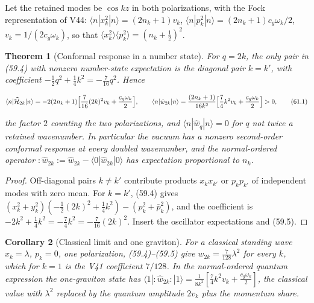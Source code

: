 \documentclass[11pt]{article}
\newtheorem{theorem}{Theorem}[section]
\newtheorem{corollary}[theorem]{Corollary}
\theoremstyle{remark}
\begin{document}
Let the retained modes be \(\cos kz\) in both polarizations, with the
Fock representation of V44: \(\langle n|x_k^2|n\rangle=(2n_k+1)v_k\),
\(\langle n|p_k^2|n\rangle=(2n_k+1)c_g\omega_k/2\), \(v_k=1/(2c_g\omega_k)\),
so that \(\langle x_k^2\rangle\langle p_k^2\rangle=(n_k+\tfrac12)^2\).

\begin{theorem}[Conformal response in a number state]
\label{thm:v19v58-conformal}
For \(q=2k\), the only pair in (59.4) with nonzero number-state
expectation is the diagonal pair \(k=k'\), with coefficient
\(-\tfrac12q^2+\tfrac14k^2=-\tfrac7{16}q^2\).  Hence

\[
 \langle n|\widehat{\cal H}_{2k}|n\rangle
 =-2(2n_k+1)\Bigl[\frac{7}{16}(2k)^2v_k+\frac{c_g\omega_k}2\Bigr],
 \qquad
 \langle n|\hat w_{2k}|n\rangle
 =\frac{(2n_k+1)}{16k^2}\Bigl[\frac74k^2v_k+\frac{c_g\omega_k}2\Bigr]>0,
                                                                    \tag{61.1}
\]

the factor \(2\) counting the two polarizations, and
\(\langle n|\hat w_q|n\rangle=0\) for \(q\) not twice a retained
wavenumber.  In particular the vacuum has a nonzero second-order
conformal response at every doubled wavenumber, and the normal-ordered
operator \(:\hat w_{2k}:=\hat w_{2k}-\langle0|\hat w_{2k}|0\rangle\) has
expectation proportional to \(n_k\).
\end{theorem}

\begin{proof}
Off-diagonal pairs \(k\neq k'\) contribute products \(x_kx_{k'}\) or
\(p_kp_{k'}\) of independent modes with zero mean.  For \(k=k'\),
(59.4) gives \((x_k^2+y_k^2)(-\tfrac12(2k)^2+\tfrac14k^2)-(p_k^2+\bar p_k^2)\),
and the coefficient is \(-2k^2+\tfrac14k^2=-\tfrac74k^2=-\tfrac7{16}(2k)^2\).
Insert the oscillator expectations and (59.5).
\end{proof}

\begin{corollary}[Classical limit and one graviton]
\label{cor:v19v58-classical}
For a classical standing wave \(x_k=\lambda\), \(p_k=0\), one
polarization, (59.4)--(59.5) give \(w_{2k}=\tfrac7{128}\lambda^2\) for
every \(k\), which for \(k=1\) is the V41 coefficient \(7/128\).  In the
normal-ordered quantum expression the one-graviton state has
\(\langle1|:\hat w_{2k}:|1\rangle=\tfrac1{8k^2}[\tfrac74k^2v_k+\tfrac{c_g\omega_k}2]\),
the classical value with \(\lambda^2\) replaced by the quantum
amplitude \(2v_k\) plus the momentum share.
\end{corollary}
\end{document}
